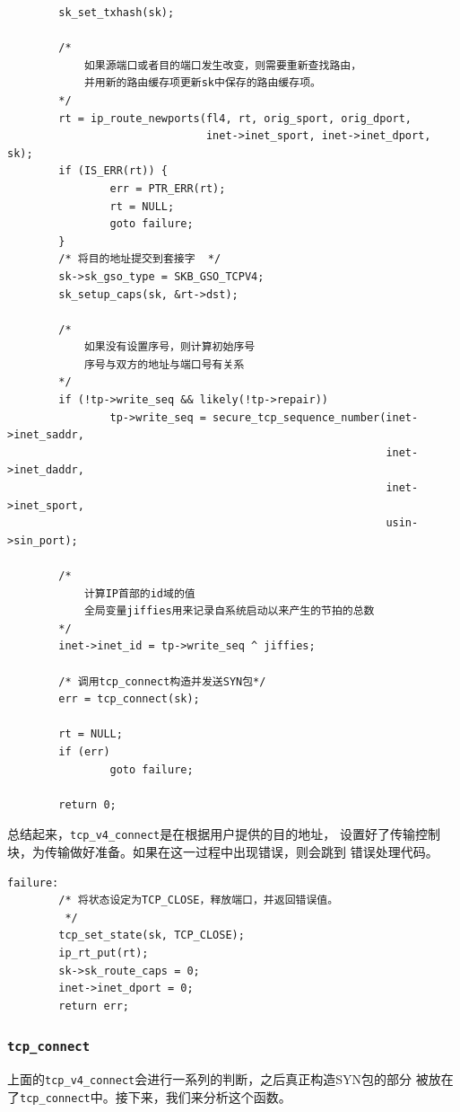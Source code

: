 \begin{verbatim}
        sk_set_txhash(sk);

        /*
            如果源端口或者目的端口发生改变，则需要重新查找路由，
            并用新的路由缓存项更新sk中保存的路由缓存项。
        */
        rt = ip_route_newports(fl4, rt, orig_sport, orig_dport,
                               inet->inet_sport, inet->inet_dport, sk);
        if (IS_ERR(rt)) {
                err = PTR_ERR(rt);
                rt = NULL;
                goto failure;
        }
        /* 将目的地址提交到套接字  */
        sk->sk_gso_type = SKB_GSO_TCPV4;
        sk_setup_caps(sk, &rt->dst);

        /*  
            如果没有设置序号，则计算初始序号 
            序号与双方的地址与端口号有关系
        */
        if (!tp->write_seq && likely(!tp->repair))
                tp->write_seq = secure_tcp_sequence_number(inet->inet_saddr,
                                                           inet->inet_daddr,
                                                           inet->inet_sport,
                                                           usin->sin_port);
                                                           
        /*  
            计算IP首部的id域的值 
            全局变量jiffies用来记录自系统启动以来产生的节拍的总数       
        */
        inet->inet_id = tp->write_seq ^ jiffies;

        /* 调用tcp_connect构造并发送SYN包*/
        err = tcp_connect(sk);

        rt = NULL;
        if (err)
                goto failure;

        return 0;
\end{verbatim}

            总结起来，\texttt{tcp_v4_connect}是在根据用户提供的目的地址，
            设置好了传输控制块，为传输做好准备。如果在这一过程中出现错误，则会跳到
            错误处理代码。
\begin{verbatim}
failure:
        /* 将状态设定为TCP_CLOSE，释放端口，并返回错误值。
         */
        tcp_set_state(sk, TCP_CLOSE);
        ip_rt_put(rt);
        sk->sk_route_caps = 0;
        inet->inet_dport = 0;
        return err;
\end{verbatim}

        \subsubsection{\texttt{tcp_connect}}
            \label{Client:tcp_connect}
            上面的\texttt{tcp_v4_connect}会进行一系列的判断，之后真正构造SYN包的部分
            被放在了\texttt{tcp_connect}中。接下来，我们来分析这个函数。

